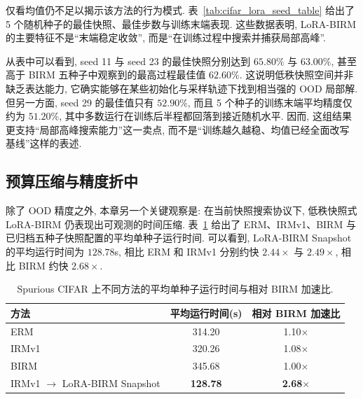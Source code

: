 \documentclass[a4paper,punct=banjiao,twoside]{ctexrep}
\theoremstyle{plain}
\theoremstyle{definition}
\theoremstyle{remark}
\begin{document}
仅看均值仍不足以揭示该方法的行为模式. 表~\ref{tab:cifar_lora_seed_table} 给出了 5 个随机种子的最佳快照、最佳步数与训练末端表现. 这些数据表明, LoRA-BIRM 的主要特征不是“末端稳定收敛”, 而是“在训练过程中搜索并捕获局部高峰”.

\begin{table}[htbp]
    \centering
    \caption{IRMv1 $\rightarrow$ LoRA-BIRM 五种子快照明细.}
    \label{tab:cifar_lora_seed_table}
\end{table}

从表中可以看到, seed 11 与 seed 23 的最佳快照分别达到 $65.80\%$ 与 $63.00\%$, 甚至高于 BIRM 五种子中观察到的最高过程最佳值 $62.60\%$. 这说明低秩快照空间并非缺乏表达能力, 它确实能够在某些初始化与采样轨迹下找到相当强的 OOD 局部解. 但另一方面, seed 29 的最佳值只有 $52.90\%$, 而且 5 个种子的训练末端平均精度仅约为 $51.20\%$, 其中多数运行在训练后半程都回落到接近随机水平. 因而, 这组结果更支持“局部高峰搜索能力”这一卖点, 而不是“训练越久越稳、均值已经全面改写基线”这样的表述.

\subsection{预算压缩与精度折中}

除了 OOD 精度之外, 本章另一个关键观察是: 在当前快照搜索协议下, 低秩快照式 LoRA-BIRM 仍表现出可观测的时间压缩. 表~\ref{tab:cifar_runtime} 给出了 ERM、IRMv1、BIRM 与已归档五种子快照配置的平均单种子运行时间. 可以看到, LoRA-BIRM Snapshot 的平均运行时间为 $128.78$s, 相比 ERM 和 IRMv1 分别约快 $2.44\times$ 与 $2.49\times$, 相比 BIRM 约快 $2.68\times$.

\begin{table}[htbp]
    \centering
    \caption{Spurious CIFAR 上不同方法的平均单种子运行时间与相对 BIRM 加速比.}
    \label{tab:cifar_runtime}
    \begin{tabular}{lcc}
        \toprule
        方法 & 平均运行时间(s) & 相对 BIRM 加速比 \\
        \midrule
        ERM & 314.20 & 1.10$\times$ \\
        IRMv1 & 320.26 & 1.08$\times$ \\
        BIRM & 345.68 & 1.00$\times$ \\
        IRMv1 $\rightarrow$ LoRA-BIRM Snapshot & \textbf{128.78} & \textbf{2.68$\times$} \\
        \bottomrule
    \end{tabular}
\end{table}
\end{document}
